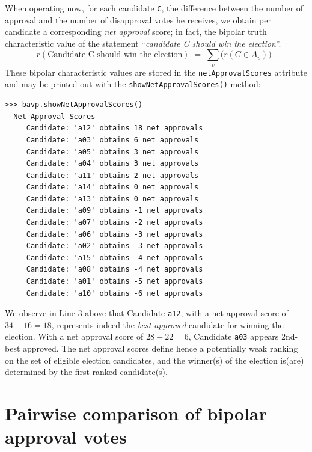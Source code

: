 When operating now, for each candidate \texttt{C}, the difference between the number of approval and the number of disapproval votes he receives, we obtain per candidate a corresponding \emph{net approval} score; in fact, the bipolar truth characteristic value of the statement ``\emph{candidate C should win the election}''.
\begin{equation}
r(\text{Candidate C should win the election}) \;=\; \sum_v \big(r(C \in A_v)\big)\;.
\end{equation}
These bipolar characteristic values are stored in the \texttt{netApprovalScores} attribute and may be printed out with the \texttt{showNetApprovalScores()} method:
\begin{lstlisting}
>>> bavp.showNetApprovalScores()
  Net Approval Scores
     Candidate: 'a12' obtains 18 net approvals
     Candidate: 'a03' obtains 6 net approvals
     Candidate: 'a05' obtains 3 net approvals
     Candidate: 'a04' obtains 3 net approvals
     Candidate: 'a11' obtains 2 net approvals
     Candidate: 'a14' obtains 0 net approvals
     Candidate: 'a13' obtains 0 net approvals
     Candidate: 'a09' obtains -1 net approvals
     Candidate: 'a07' obtains -2 net approvals
     Candidate: 'a06' obtains -3 net approvals
     Candidate: 'a02' obtains -3 net approvals
     Candidate: 'a15' obtains -4 net approvals
     Candidate: 'a08' obtains -4 net approvals
     Candidate: 'a01' obtains -5 net approvals
     Candidate: 'a10' obtains -6 net approvals
\end{lstlisting}
We observe in Line 3 above that Candidate \texttt{a12}, with a net approval score of $34 - 16 = 18$, represents indeed the \emph{best approved} candidate for winning the election. With a net approval score of $28-22 = 6$, Candidate \texttt{a03} appears 2nd-best approved. The net approval scores define hence a potentially weak ranking on the set of eligible election candidates, and the winner(s) of the election is(are) determined by the first-ranked candidate(s).

\section{Pairwise comparison of bipolar approval votes}
\label{sec:21.1}

